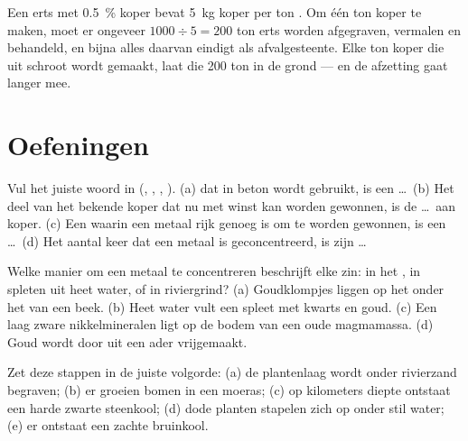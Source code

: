 \begin{example}\label{ex:g9:earth-resources:recycling}
Een erts met \qty{0.5}{\%} koper bevat \qty{5}{kg} koper per ton .
Om één ton koper te maken, moet er ongeveer $1000 \div 5 = 200$ ton erts
worden afgegraven, vermalen en behandeld, en bijna alles daarvan eindigt
als afvalgesteente. Elke ton koper die uit schroot wordt gemaakt, laat die
200 ton  in de grond --- en de afzetting gaat langer mee.
\end{example}


\section{Oefeningen}

\begin{exercise}[$\star$]\label{exo:g9:earth-resources:1}
Vul het juiste woord in (, ,
, ). (a)  dat in beton wordt gebruikt, is een
\ldots\ (b) Het deel van het bekende koper dat nu met winst kan worden
gewonnen, is de \ldots\ aan koper. (c) Een  waarin een metaal
rijk genoeg is om te worden gewonnen, is een \ldots\ (d) Het aantal keer
dat een metaal is geconcentreerd, is zijn \ldots
\end{exercise}

\begin{exercise}[$\star$]\label{exo:g9:earth-resources:2}
Welke manier om een metaal te concentreren beschrijft elke zin: in het
, in spleten uit heet water, of in riviergrind? (a) Goudklompjes
liggen op het  onder het  van een beek. (b) Heet water
vult een spleet met kwarts en goud. (c) Een laag zware nikkelmineralen
ligt op de bodem van een oude magmamassa. (d) Goud wordt door  uit
een ader vrijgemaakt.
\end{exercise}

\begin{exercise}[$\star$]\label{exo:g9:earth-resources:3}
Zet deze stappen in de juiste volgorde: (a) de plantenlaag wordt onder
rivierzand begraven; (b) er groeien bomen in een moeras; (c) op
kilometers diepte ontstaat een harde zwarte steenkool; (d) dode planten
stapelen zich op onder stil water; (e) er ontstaat een zachte bruinkool.
\end{exercise}


